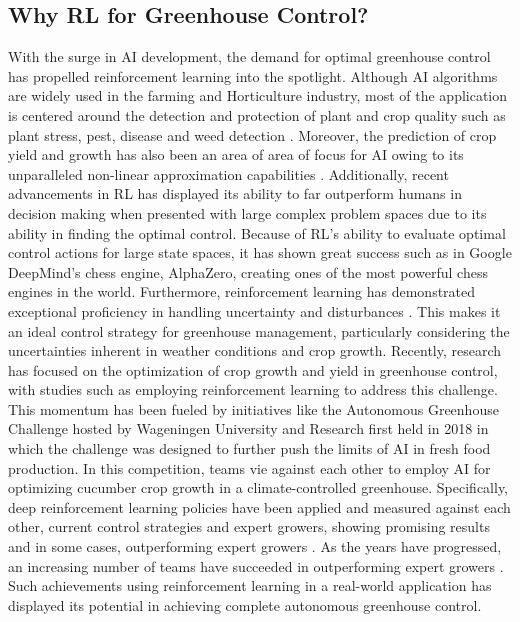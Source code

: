 \subsection{Why RL for Greenhouse Control?}
With the surge in AI development, the demand for optimal greenhouse control has propelled reinforcement learning into the spotlight. Although AI algorithms are widely used in the farming and Horticulture industry, most of the application is centered around the detection and protection of plant and crop quality such as plant stress, pest, disease and weed detection \cite{hemmingCherryTomatoProduction2020}. Moreover, the prediction of crop yield and growth has also been an area of area of focus for AI owing to its unparalleled non-linear approximation capabilities \cite{gongDeepLearningBased2021}. Additionally, recent advancements in RL has displayed its ability to far outperform humans in decision making when presented with large complex problem spaces \cite{bonsaiWhyReinforcementLearning2017} due to its ability in finding the optimal control. Because of RL's ability to evaluate optimal control actions for large state spaces, it has shown great success such as in Google DeepMind's chess engine, AlphaZero, creating ones of the most powerful chess engines in the world. Furthermore, reinforcement learning has demonstrated exceptional proficiency in handling uncertainty and disturbances \cite{daaboulUncertaintyPredictionModelbased2020}. This makes it an ideal control strategy for greenhouse management, particularly considering the uncertainties inherent in weather conditions and crop growth. Recently, research has focused on the optimization of crop growth and yield in greenhouse control, with studies such as \cite{ajagekarDeepReinforcementLearning2022,wangDeepReinforcementLearning2020,ajagekarEnergyefficientAIbasedControl2023,decardi-nelsonbenjaminImprovingResourceUse2023,zhangRobustModelbasedReinforcement2021,jansenOptimalControlLettuce2023,vanmourikPlantPerformancePrecision2023} employing reinforcement learning to address this challenge. This momentum has been fueled by initiatives like the Autonomous Greenhouse Challenge hosted by Wageningen University and Research first held in 2018 in which the challenge was designed to further push the limits of AI in fresh food production. In this competition, teams vie against each other to employ AI for optimizing cucumber crop growth in a climate-controlled greenhouse. Specifically, deep reinforcement learning policies have been applied and measured against each other, current control strategies and expert growers, showing promising results and in some cases, outperforming expert growers \cite{vandenbemdRobustDeepReinforcement,wangDeepReinforcementLearning2020}. As the years have progressed, an increasing number of teams have succeeded in outperforming expert growers \cite{vandenbemdRobustDeepReinforcement,hemmingCherryTomatoProduction2020}. Such achievements using reinforcement learning in a real-world application has displayed its potential in achieving complete autonomous greenhouse control.

